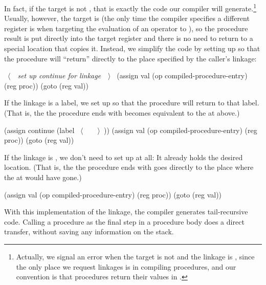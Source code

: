 In fact, if the target is not , that is exactly the code our compiler
will generate.\footnote{Actually, we signal an error when the target is not
 and the linkage is , since the only place we request
 linkages is in compiling procedures, and our convention is that
procedures return their values in .}  Usually, however, the target is
 (the only time the compiler specifies a different register is when
targeting the evaluation of an operator to ), so the procedure
result is put directly into the target register and there is no need to return
to a special location that copies it.  Instead, we simplify the code by setting
up  so that the procedure will ``return'' directly to the place
specified by the caller's linkage:

\begin{codeBlock}
~\(\langle \)~~\emph{set up \emph{continue} for linkage}~~\(\rangle \)~
(assign val (op compiled-procedure-entry) (reg proc))
(goto (reg val))
\end{codeBlock}

\noindent
If the linkage is a label, we set up  so that the procedure will
return to that label.  (That is, the  the procedure
ends with becomes equivalent to the  at
 above.)

\begin{codeBlock}
(assign continue (label ~\(\langle \)~~~~\(\rangle \)~))
(assign val (op compiled-procedure-entry) (reg proc))
(goto (reg val))
\end{codeBlock}

\noindent
If the linkage is , we don't need to set up  at
all: It already holds the desired location.  (That is, the  the procedure ends with goes directly to the place where the
 at  would have gone.)

\begin{codeBlock}
(assign val (op compiled-procedure-entry) (reg proc))
(goto (reg val))
\end{codeBlock}

\noindent
With this implementation of the  linkage, the compiler generates
tail-recursive code.  Calling a procedure as the final step in a procedure body
does a direct transfer, without saving any information on the stack.

